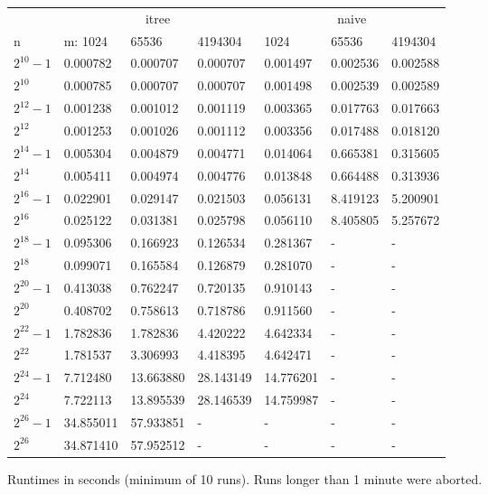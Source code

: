 \documentclass[a4paper,10pt]{article}
\begin{document}
\vspace{3mm}

\begin{figure}
\begin{tabular}{lllllll}
\toprule
  & \multicolumn{3}{c}{itree} & \multicolumn{3}{c}{naive} \\
\cmidrule(r){2-4} \cmidrule(r){5-7}
n & m: 1024 & 65536 & 4194304 & 1024 & 65536 & 4194304 \\
\midrule
$2^{10} - 1$ & 0.000782 & 0.000707 & 0.000707 & 0.001497 & 0.002536 & 0.002588 \\
$2^{10}$ & 0.000785 & 0.000707 & 0.000707 & 0.001498 & 0.002539 & 0.002589 \\
$2^{12} - 1$ & 0.001238 & 0.001012 & 0.001119 & 0.003365 & 0.017763 & 0.017663 \\
$2^{12}$ & 0.001253 & 0.001026 & 0.001112 & 0.003356 & 0.017488 & 0.018120 \\
$2^{14} - 1$ & 0.005304 & 0.004879 & 0.004771 & 0.014064 & 0.665381 & 0.315605 \\
$2^{14}$ & 0.005411 & 0.004974 & 0.004776 & 0.013848 & 0.664488 & 0.313936 \\
$2^{16} - 1$ & 0.022901 & 0.029147 & 0.021503 & 0.056131 & 8.419123 & 5.200901 \\
$2^{16}$ & 0.025122 & 0.031381 & 0.025798 & 0.056110 & 8.405805 & 5.257672 \\
$2^{18} - 1$ & 0.095306 & 0.166923 & 0.126534 & 0.281367 & - & - \\
$2^{18}$ & 0.099071 & 0.165584 & 0.126879 & 0.281070 & - & - \\
$2^{20} - 1$ & 0.413038 & 0.762247 & 0.720135 & 0.910143 & - & - \\
$2^{20}$ & 0.408702 & 0.758613 & 0.718786 & 0.911560 & - & - \\
$2^{22} - 1$ & 1.782836 & 1.782836 & 4.420222 & 4.642334 & - & - \\
$2^{22}$ & 1.781537 & 3.306993 & 4.418395 & 4.642471 & - & - \\
$2^{24} - 1$ & 7.712480 & 13.663880 & 28.143149 & 14.776201 & - & - \\
$2^{24}$ & 7.722113 & 13.895539 & 28.146539 & 14.759987 & - & - \\
$2^{26} - 1$ & 34.855011 & 57.933851 & - & - & - & - \\
$2^{26}$ & 34.871410 & 57.952512 & - & - & - & - \\
\bottomrule
\end{tabular}
\caption{Runtimes in seconds (minimum of 10 runs). Runs longer than 1 minute were aborted.}
\label{fig:resultstable}
\end{figure}
\end{document}
